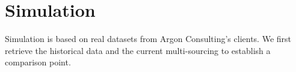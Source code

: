 



\section{Simulation}


Simulation is based on real datasets from Argon Consulting’s clients.
We first retrieve the historical data and the current multi-sourcing to establish a comparison point.


